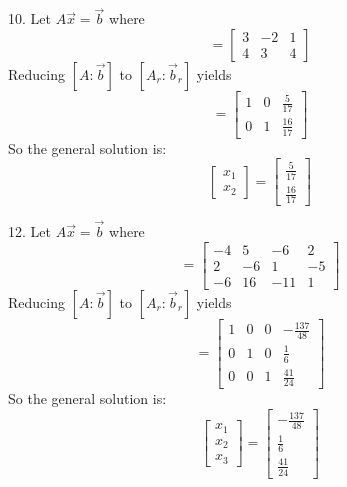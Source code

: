 \documentclass[11pt]{homework}
\begin{document}
10. Let $ A \vec x = \vec b$ where
\begin{equation*}
  [A: \vec b] = 
  \left[
  \begin{array}{cc|c}
  3 & -2 & 1  \\
  4 & 3 &  4
  \end{array}
  \right]
\end{equation*}
Reducing $[A: \vec b]$ to $[A_r: \vec b_r]$ yields
\begin{equation*}
  [A_r: \vec b_r] = 
  \left[
  \begin{array}{cc|c}
  1 & 0 & \frac{5}{17} \\
  0 & 1 & \frac{16}{17}
  \end{array}
  \right]
\end{equation*}
So the general solution is:
\begin{equation*}
  \begin{bmatrix}
  x_1 \\
  x_2 
  \end{bmatrix}
  =
  \begin{bmatrix}
  \frac{5}{17} \\
  \frac{16}{17}
  \end{bmatrix}
\end{equation*}

12. Let $ A \vec x = \vec b$ where
\begin{equation*}
  [A: \vec b] = 
  \left[
  \begin{array}{ccc|c}
  -4 & 5 & -6 & 2  \\
   2 & -6 & 1 & -5  \\
  -6 & 16 & -11 & 1  
  \end{array}
  \right]
\end{equation*}
Reducing $[A: \vec b]$ to $[A_r: \vec b_r]$ yields
\begin{equation*}
  [A_r: \vec b_r] = 
  \left[
  \begin{array}{ccc|c}
  1 & 0 & 0 & -\frac{137}{48} \\
  0 & 1 & 0 & \frac{1}{6} \\
  0 & 0 & 1 & \frac{41}{24}
  \end{array}
  \right]
\end{equation*}
So the general solution is:
\begin{equation*}
  \begin{bmatrix}
  x_1 \\
  x_2 \\
  x_3
  \end{bmatrix}
  =
  \begin{bmatrix}
  -\frac{137}{48} \\
  \frac{1}{6} \\
  \frac{41}{24}        
  \end{bmatrix}
\end{equation*}
\end{document}
